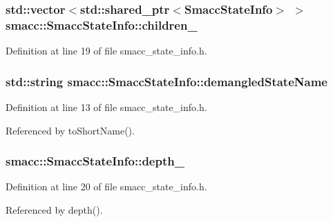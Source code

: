 \subsubsection[{\texorpdfstring{children\+\_\+}{children_}}]{\setlength{\rightskip}{0pt plus 5cm}std\+::vector$<$std\+::shared\+\_\+ptr$<${\bf Smacc\+State\+Info}$>$ $>$ smacc\+::\+Smacc\+State\+Info\+::children\+\_\+}\hypertarget{classsmacc_1_1SmaccStateInfo_a7773f1d9e865a839b0bfed087bbb93ba}{}\label{classsmacc_1_1SmaccStateInfo_a7773f1d9e865a839b0bfed087bbb93ba}


Definition at line 19 of file smacc\+\_\+state\+\_\+info.\+h.

\subsubsection[{\texorpdfstring{demangled\+State\+Name}{demangledStateName}}]{\setlength{\rightskip}{0pt plus 5cm}std\+::string smacc\+::\+Smacc\+State\+Info\+::demangled\+State\+Name}\hypertarget{classsmacc_1_1SmaccStateInfo_ad36e29f3984e40d36664567f9703239a}{}\label{classsmacc_1_1SmaccStateInfo_ad36e29f3984e40d36664567f9703239a}


Definition at line 13 of file smacc\+\_\+state\+\_\+info.\+h.



Referenced by to\+Short\+Name().

\subsubsection[{\texorpdfstring{depth\+\_\+}{depth_}}]{ smacc\+::\+Smacc\+State\+Info\+::depth\+\_\+}\hypertarget{classsmacc_1_1SmaccStateInfo_a3f44d5af069d0f37ed63b3101b330a65}{}\label{classsmacc_1_1SmaccStateInfo_a3f44d5af069d0f37ed63b3101b330a65}


Definition at line 20 of file smacc\+\_\+state\+\_\+info.\+h.



Referenced by depth().

